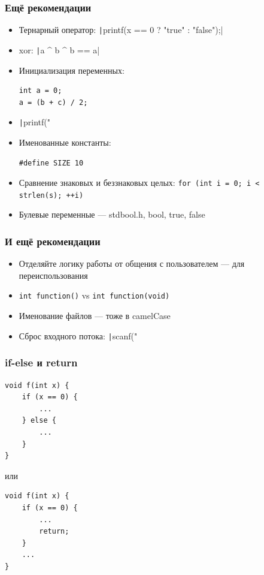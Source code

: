 \documentclass{../../slides-style}
\begin{document}
    \begin{frame}[fragile]
        \frametitle{Ещё рекомендации}
        \begin{itemize}
            \item Тернарный оператор: \texttt|printf(x == 0 ? "true" :  "false");|
            \item xor: \texttt|a ^ b ^ b == a|
            \item Инициализация переменных:
                \begin{verbatim}
int a = 0;
a = (b + c) / 2;
                \end{verbatim}
            \item \texttt|printf("%
            \item Именованные константы: 
                \begin{verbatim}
#define SIZE 10
                \end{verbatim}
            \item Сравнение знаковых и беззнаковых целых: \texttt{for (int i = 0; i < strlen(s); ++i)}
            \item Булевые переменные --- stdbool.h, bool, true, false
        \end{itemize}
    \end{frame}

    \begin{frame}[fragile]
        \frametitle{И ещё рекомендации}
        \begin{itemize}
            \item Отделяйте логику работы от общения с пользователем --- для переиспользования
            \item \texttt{int function()} vs \texttt{int function(void)}
            \item Именование файлов --- тоже в camelCase
            \item Сброс входного потока: \texttt|scanf("%
        \end{itemize}
    \end{frame}

    \begin{frame}[fragile]
        \frametitle{if-else и return}
        \begin{verbatim}
void f(int x) {
    if (x == 0) {
        ...
    } else {
        ...
    }
}
        \end{verbatim}
        или
        \begin{verbatim}
void f(int x) {
    if (x == 0) {
        ...
        return;
    } 
    ...
}
        \end{verbatim}
    \end{frame}
\end{document}

